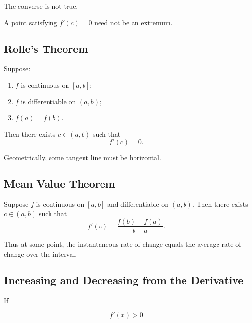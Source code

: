 The converse is not true.

A point satisfying \(f'(c)=0\) need not be an extremum.

\subsection{Rolle's Theorem}
\label{subsec:rolles-theorem}

\begin{theorem}
Suppose:
\begin{enumerate}
    \item \(f\) is continuous on \([a,b]\);
    \item \(f\) is differentiable on \((a,b)\);
    \item \(f(a)=f(b)\).
\end{enumerate}
Then there exists \(c\in(a,b)\) such that
\[ f'(c)=0. \]
\end{theorem}

Geometrically, some tangent line must be horizontal.

\subsection{Mean Value Theorem}
\label{subsec:mean-value-theorem}

\begin{theorem}
Suppose \(f\) is continuous on \([a,b]\) and differentiable on \((a,b)\).
Then there exists \(c\in(a,b)\) such that
\[ f'(c)=\frac{f(b)-f(a)}{b-a}. \]
\end{theorem}

Thus at some point, the instantaneous rate of change equals the average rate
of change over the interval.

\subsection{Increasing and Decreasing from the Derivative}
\label{subsec:derivative-monotonicity}

If

\[ f'(x)>0 \]

